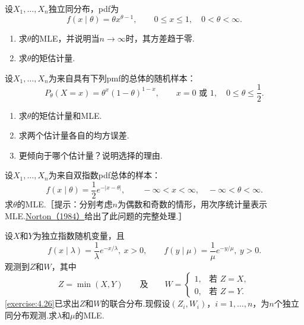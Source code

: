 \begin{exercise}\label{exercise:7.11}
设$X_1,\ldots,X_n$独立同分布，pdf为
$$f(x\mid\theta)=\theta x^{\theta-1},\qquad0\le x\le1,\quad0<\theta<\infty.$$
\begin{enumerate}[label=(\alph*)]
\item 求$\theta$的MLE，并说明当$n\to\infty$时，其方差趋于零.
\item 求$\theta$的矩估计量.
\end{enumerate}
\end{exercise}
\begin{exercise}\label{exercise:7.12}
设$X_1,\ldots,X_n$为来自具有下列pmf的总体的随机样本：
$$P_\theta(X=x)=\theta^x(1-\theta)^{1-x},\qquad x=0\text{ 或 }1,\quad0\le\theta\le\frac12.$$
\begin{enumerate}[label=(\alph*)]
\item 求$\theta$的矩估计量和MLE.
\item 求两个估计量各自的均方误差.
\item 更倾向于哪个估计量？说明选择的理由.
\end{enumerate}
\end{exercise}
\begin{exercise}\label{exercise:7.13}
设$X_1,\ldots,X_n$为来自双指数pdf总体的样本：
$$f(x\mid\theta)=\frac12e^{-|x-\theta|},\qquad-\infty<x<\infty,\quad-\infty<\theta<\infty.$$
求$\theta$的MLE.［提示：分别考虑$n$为偶数和奇数的情形，用次序统计量表示MLE.\hyperref[bib:source235]{Norton（1984）}给出了此问题的完整处理.］
\end{exercise}
\begin{exercise}\label{exercise:7.14}
设$X$和$Y$为独立指数随机变量，且
$$f(x\mid\lambda)=\frac1\lambda e^{-x/\lambda},\ x>0,\qquad f(y\mid\mu)=\frac1\mu e^{-y/\mu},\ y>0.$$
观测到$Z$和$W$，其中
$$Z=\min(X,Y)\qquad\text{及}\qquad W=\begin{cases}1,&\text{若 }Z=X,\\0,&\text{若 }Z=Y.\end{cases}$$
\autoref{exercise:4.26}已求出$Z$和$W$的联合分布.现假设$(Z_i,W_i)$，$i=1,\ldots,n$，为$n$个独立同分布观测.求$\lambda$和$\mu$的MLE.
\end{exercise}
